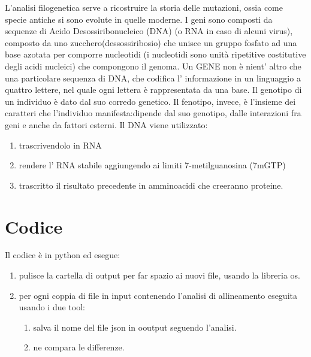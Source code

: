 \documentclass[11pt,italian]{article}
\begin{document}
	L'analisi filogenetica serve a ricostruire la storia delle mutazioni, ossia come specie antiche si sono evolute in quelle moderne.\newline
	I geni sono composti da sequenze di Acido Desossiribonucleico (DNA) (o RNA in caso di alcuni virus), composto da uno zucchero(dessossiribosio) che unisce un gruppo fosfato ad una base azotata per comporre nucleotidi (i nucleotidi sono unità ripetitive costitutive degli acidi nucleici) che compongono il genoma.\newline
	Un GENE non è nient' altro che una particolare sequenza di DNA, che codifica l' informazione in un linguaggio a quattro lettere, nel quale ogni lettera è rappresentata da una base.\newline
	Il genotipo di un individuo è dato dal suo corredo genetico.
Il fenotipo, invece, è l'insieme dei caratteri che l'individuo manifesta:dipende dal suo genotipo, dalle interazioni fra geni e anche da fattori
esterni.\newline
\newline Il DNA viene utilizzato: \begin{enumerate} \item trascrivendolo in RNA
\item rendere l' RNA stabile aggiungendo ai limiti 7-metilguanosina (7mGTP)
\item trascritto il risultato precedente in amminoacidi che creeranno proteine.
	 \end{enumerate}

\newpage
\section{Codice}
	Il codice è in python ed esegue:
	\begin{enumerate}
		\item pulisce la cartella di output per far spazio ai nuovi file, usando la libreria os.
		\item per ogni coppia di file in input contenendo l'analisi di allineamento eseguita usando i due tool:
		\begin{enumerate}
			\item salva il nome del file json in ooutput seguendo l'analisi.
			\item ne compara le differenze.
		\end{enumerate}
	\end{enumerate}
\end{document}
